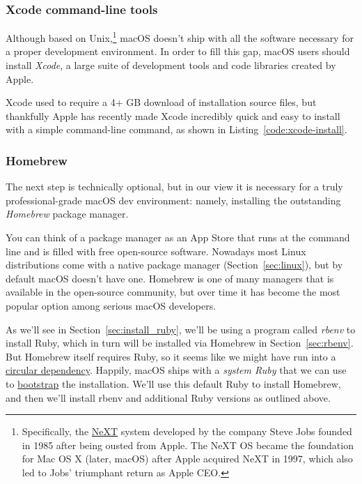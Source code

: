 

\subsubsection{Xcode command-line tools}
\label{sec:shiny_xcode}

Although based on Unix,\footnote{Specifically, the \href{https://en.wikipedia.org/wiki/NeXT}{NeXT} system developed by the company Steve Jobs founded in 1985 after being ousted from Apple. The NeXT OS became the foundation for Mac OS X (later, macOS) after Apple acquired NeXT in 1997, which also led to Jobs' triumphant return as Apple CEO\@.} macOS doesn't ship with all the software necessary for a proper development environment. In order to fill this gap, macOS users should install \emph{Xcode}, a large suite of development tools and code libraries created by Apple.

Xcode used to require a 4+ GB download of installation source files, but thankfully Apple has recently made Xcode incredibly quick and easy to install with a simple command-line command, as shown in Listing~\ref{code:xcode-install}.

\begin{codelisting}
\label{code:xcode-install}
\end{codelisting}


\subsubsection{Homebrew}
\label{sec:homebrew}

The next step is technically optional, but in our view it is necessary for a truly professional-grade macOS dev environment: namely, installing the outstanding \emph{Homebrew} package manager.

You can think of a package manager as an App Store that runs at the command line and is filled with free open-source software. Nowadays most Linux distributions come with a native package manager (Section~\ref{sec:linux}), but by default macOS doesn't have one. Homebrew is one of many managers that is available in the open-source community, but over time it has become the most popular option among serious macOS developers.

As we'll see in Section~\ref{sec:install_ruby}, we'll be using a program called \emph{rbenv} to install Ruby, which in turn will be installed via Homebrew in Section~\ref{sec:rbenv}. But Homebrew itself requires Ruby, so it seems like we might have run into a \href{https://en.wikipedia.org/wiki/Circular_dependency}{circular dependency}. Happily, macOS ships with a \emph{system Ruby} that we can use to \href{https://en.wikipedia.org/wiki/Bootstrapping}{bootstrap} the installation. We'll use this default Ruby to install Homebrew, and then we'll install rbenv and additional Ruby versions as outlined above.

